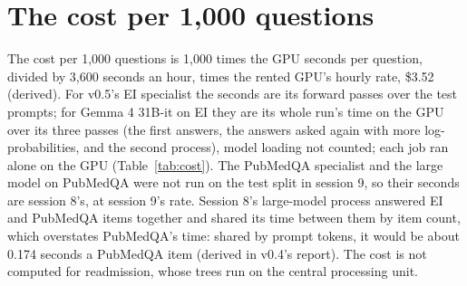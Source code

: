 \documentclass[11pt,letterpaper]{article}
\newcommand{\idn}[1]{#1}%
\begin{document}
\begin{table}[H]
\centering\footnotesize
\caption{The PubMedQA specialist on PubMedQA's 500 test items, each answer against the rest: the calibration slope (1 is ideal) and intercept (0 is ideal), defined as in Table~\ref{tab:answers}, each with its 95 percent interval from 1,000 item resamples (descriptive: this test split was read in every version).}
\label{tab:pqaanswers}

\end{table}

\section{The cost per 1,000 questions}
\label{app:cost}

The cost per 1,000 questions is 1,000 times the GPU seconds per question, divided by 3,600 seconds an hour, times the rented GPU's hourly rate, \$3.52 (derived). For v0.5's EI specialist the seconds are its forward passes over the test prompts; for Gemma 4 31B-it on EI they are its whole run's time on the GPU over its three passes (the first answers, the answers asked again with more log-probabilities, and the second process), model loading not counted; each job ran alone on the GPU (Table~\ref{tab:cost}). The PubMedQA specialist and the large model on PubMedQA were not run on the test split in session \idn{9}, so their seconds are session \idn{8}'s, at session \idn{9}'s rate. Session \idn{8}'s large-model process answered EI and PubMedQA items together and shared its time between them by item count, which overstates PubMedQA's time: shared by prompt tokens, it would be about 0.174 seconds a PubMedQA item (derived in v0.4's report). The cost is not computed for readmission, whose trees run on the central processing unit.

\begin{table}[H]
\centering\footnotesize
\caption{The GPU time per question and the cost per 1,000 questions (derived) at the rented GPU's rate, \$3.52 an hour. GPU is graphics processing unit. The large model's PubMedQA time is session \idn{8}'s share by item count, which overstates it (see the text).}
\label{tab:cost}

\end{table}
\end{document}
